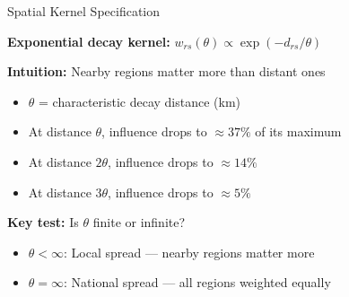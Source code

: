 \documentclass[aspectratio=169]{beamer}
\begin{document}
\begin{frame}{Spatial Kernel Specification}

\textbf{Exponential decay kernel:} $w_{rs}(\theta) \propto \exp(-d_{rs}/\theta)$

\vspace{1em}

\textbf{Intuition:} Nearby regions matter more than distant ones

\begin{itemize}
    \item $\theta$ = characteristic decay distance (km)
    \item At distance $\theta$, influence drops to $\approx 37\%$ of its maximum
    \item At distance $2\theta$, influence drops to $\approx 14\%$
    \item At distance $3\theta$, influence drops to $\approx 5\%$
\end{itemize}

\vspace{1em}

\textbf{Key test:} Is $\theta$ finite or infinite?

\begin{itemize}
    \item $\theta < \infty$: Local spread --- nearby regions matter more
    \item $\theta = \infty$: National spread --- all regions weighted equally
\end{itemize}

\end{frame}
\end{document}
